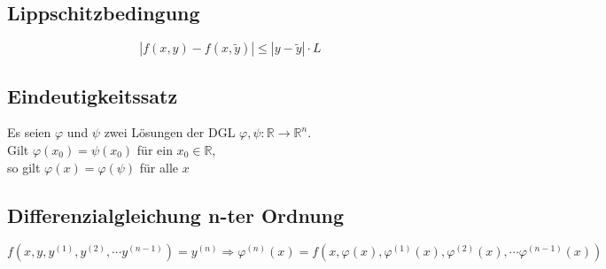 \subsection{Lippschitzbedingung}
\begin{equation*}
    |f(x, y) - f(x, \tilde{y})| \leq |y - \tilde{y}| \cdot L
\end{equation*}

\subsection{Eindeutigkeitssatz}
Es seien $\varphi$ und $\psi$ zwei Lösungen der DGL $\varphi, \psi: \mathbb{R} \rightarrow \mathbb{R}^n$. \\
Gilt $\varphi(x_0) = \psi(x_0)$ für ein $x_0 \in \mathbb{R}$, \\
so gilt $\varphi(x) = \varphi(\psi)$ für alle $x$

\subsection{Differenzialgleichung n-ter Ordnung}
\begin{equation*}
    f(x, y, y^{(1)}, y^{(2)}, \cdots y^{(n-1)}) = y^{(n)}
    \Rightarrow
    \varphi^{(n)}(x) = f(x, \varphi(x), \varphi^{(1)}(x), \varphi^{(2)}(x), \cdots \varphi^{(n-1)}(x))
\end{equation*}
